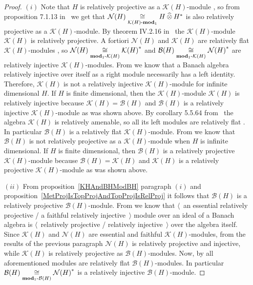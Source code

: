 \begin{proof} $(i)$ Note that $H$ is relatively projective as
a $\mathcal{K}(H)$-module \cite[theorem 7.1.27]{HelBanLocConvAlg}, so from
proposition 7.1.13 in~\cite{HelBanLocConvAlg} we get that
$\mathcal{N}(H)\mathrel{\mathop{\cong}\limits_{\mathcal{K}(H)\text{-}\mathbf{mod}_1}}H\mathbin{\widehat{\otimes}} H^*$ is also
relatively projective as a $\mathcal{K}(H)$-module. By theorem IV.2.16
in~\cite{HelHomolBanTopAlg} the $\mathcal{K}(H)$-module $\mathcal{K}(H)$ is
relatively projective. A fortiori $\mathcal{N}(H)$ and $\mathcal{K}(H)$ are
relatively flat $\mathcal{K}(H)$-modules 
\cite[proposition 7.1.40]{HelBanLocConvAlg}, 
so $\mathcal{N}(H)\mathrel{\mathop{\cong}\limits_{\mathbf{mod}_1\text{-}\mathcal{K}(H)}}{\mathcal{K}(H)}^*$
and  $\mathcal{B}(H)\mathrel{\mathop{\cong}\limits_{\mathbf{mod}_1\text{-}\mathcal{K}(H)}}{\mathcal{N}(H)}^*$ are
relatively injective $\mathcal{K}(H)$-modules. From
\cite[proposition 2.2.8 (i)]{RamsHomPropSemgroupAlg} we know that a Banach
algebra relatively injective over itself as a right module necessarily has a
left identity. Therefore, $\mathcal{K}(H)$ is not a relatively injective
$\mathcal{K}(H)$-module for infinite dimensional $H$. If $H$ is finite
dimensional, then the $\mathcal{K}(H)$-module $\mathcal{K}(H)$ is relatively
injective because $\mathcal{K}(H)=\mathcal{B}(H)$ and $\mathcal{B}(H)$ is
a relatively injective $\mathcal{K}(H)$-module as was shown above. By corollary
5.5.64 from~\cite{DalBanAlgAutCont} the algebra $\mathcal{K}(H)$ is relatively
amenable, so all its left modules are relatively flat \cite[theorem 7.1.60]{HelBanLocConvAlg}. In particular $\mathcal{B}(H)$ is a relatively flat
$\mathcal{K}(H)$-module. From \cite[exercise V.2.20]{HelHomolBanTopAlg} we
know that $\mathcal{B}(H)$ is not relatively projective as
a $\mathcal{K}(H)$-module when $H$ is infinite dimensional. If $H$ is finite
dimensional, then $\mathcal{B}(H)$ is a relatively projective
$\mathcal{K}(H)$-module because $\mathcal{B}(H)=\mathcal{K}(H)$ and
$\mathcal{K}(H)$ is a relatively projective $\mathcal{K}(H)$-module as was shown
above.

$(ii)$ From proposition~\ref{KHAndBHModBH} paragraph $(i)$ and
proposition~\ref{MetProjIsTopProjAndTopProjIsRelProj} it follows that
$\mathcal{B}(H)$ is a relatively projective $\mathcal{B}(H)$-module. From
\cite[propositions 2.3.3, 2.3.4]{RamsHomPropSemgroupAlg} we know that
$\langle$~an essential relatively projective / a faithful relatively
injective~$\rangle$ module over an ideal of a Banach algebra 
is $\langle$~relatively projective / relatively injective~$\rangle$ over 
the algebra itself. Since $\mathcal{K}(H)$ and $\mathcal{N}(H)$ are essential 
and faithful $\mathcal{K}(H)$-modules, from the results of the previous paragraph
$\mathcal{N}(H)$ is relatively projective and injective, while $\mathcal{K}(H)$
is relatively projective as $\mathcal{B}(H)$-modules. Now, by
\cite[proposition 7.1.40]{HelBanLocConvAlg} all aforementioned modules are
relatively flat $\mathcal{B}(H)$-modules. In particular
$\mathcal{B}(H)\mathrel{\mathop{\cong}\limits_{\mathbf{mod}_1\text{-}\mathcal{B}(H)}}{\mathcal{N}(H)}^*$ is
a relatively injective $\mathcal{B}(H)$-module.
\end{proof}


